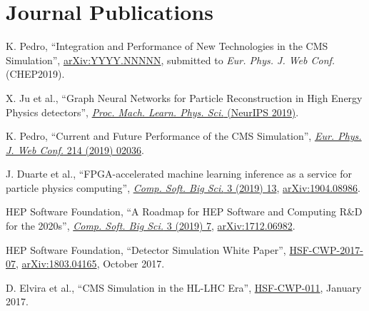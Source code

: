\section{Journal Publications}
\begin{description}[leftmargin=12pt,font=\normalfont,labelsep=0em]
\item K. Pedro, ``Integration and Performance of New Technologies in the CMS Simulation'', \href{https://arxiv.org/abs/YYYY.NNNNN}{arXiv:YYYY.NNNNN}, submitted to \emph{Eur. Phys. J. Web Conf.} (CHEP2019).
\item X. Ju et al., ``Graph Neural Networks for Particle Reconstruction in High Energy Physics detectors'', \href{https://ml4physicalsciences.github.io/\#papers}{\emph{Proc. Mach. Learn. Phys. Sci.} (NeurIPS 2019)}.
\item K. Pedro, ``Current and Future Performance of the CMS Simulation'', \href{https://doi.org/10.1051/epjconf/201921402036}{\emph{Eur. Phys. J. Web Conf.} 214 (2019) 02036}.
\item \begin{sloppypar}J. Duarte et al., ``FPGA-accelerated machine learning inference as a service for particle physics computing'', \href{https://doi.org/10.1007/s41781-019-0027-2}{\emph{Comp. Soft. Big Sci.} 3 (2019) 13}, \href{https://arxiv.org/abs/1904.08986}{arXiv:1904.08986}.\end{sloppypar}
\item HEP Software Foundation, ``A Roadmap for HEP Software and Computing R\&D for the 2020s'', \href{https://doi.org/10.1007/s41781-018-0018-8}{\emph{Comp. Soft. Big Sci.} 3 (2019) 7}, \href{https://arxiv.org/abs/1712.06982}{arXiv:1712.06982}.
\item HEP Software Foundation, ``Detector Simulation White Paper'', \href{http://hepsoftwarefoundation.org/activities/cwp.html}{HSF-CWP-2017-07}, \href{https://arxiv.org/abs/1803.04165}{arXiv:1803.04165}, October 2017.
\item D. Elvira et al., ``CMS Simulation in the HL-LHC Era'', \href{http://hepsoftwarefoundation.org/cwp-whitepapers.html}{HSF-CWP-011}, January 2017.
\end{description}

